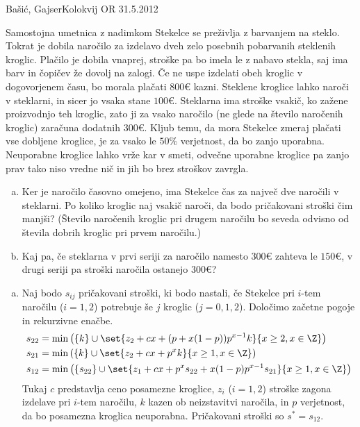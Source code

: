 \begin{naloga}{Bašić, Gajser}{Kolokvij OR 31.5.2012}
\begin{vprasanje}
Samostojna umetnica z nadimkom Stekelce se preživlja z barvanjem na steklo.
Tokrat je dobila naročilo
za izdelavo dveh zelo posebnih pobarvanih steklenih kroglic.
Plačilo je dobila vnaprej, stroške pa bo imela le z nabavo stekla,
saj ima barv in čopičev že dovolj na zalogi.
Če ne uspe izdelati obeh kroglic v dogovorjenem času,
bo morala plačati $800 €$ kazni.
Steklene kroglice lahko naroči v steklarni, in sicer jo vsaka stane $100 €$.
Steklarna ima stroške vsakič, ko zažene proizvodnjo teh kroglic,
zato ji za vsako naročilo (ne glede na število naročenih kroglic)
zaračuna dodatnih $300 €$.
Kljub temu, da mora Stekelce zmeraj plačati vse dobljene kroglice,
je za vsako le $50 \%$ verjetnost, da bo zanjo uporabna.
Neuporabne kroglice lahko vrže kar v smeti,
odvečne uporabne kroglice pa zanjo prav tako niso vredne nič
in jih bo brez stroškov zavrgla.
\begin{enumerate}[(a)]
\item Ker je naročilo časovno omejeno,
ima Stekelce čas za največ dve naročili v steklarni.
Po koliko kroglic naj vsakič naroči, da bodo pričakovani stroški čim manjši?
(Število naročenih kroglic pri drugem naročilu
bo seveda odvisno od števila dobrih kroglic pri prvem naročilu.)

\item Kaj pa,
če steklarna v prvi seriji za naročilo namesto $300 €$ zahteva le $150 €$,
v drugi seriji pa stroški naročila ostanejo $300 €$?
\end{enumerate}
\end{vprasanje}

\begin{odgovor}
\begin{enumerate}[(a)]
\item Naj bodo $s_{ij}$ pričakovani stroški, ki bodo nastali,
če Stekelce pri $i$-tem naročilu ($i = 1, 2$)
potrebuje še $j$ kroglic ($j = 0, 1, 2$).
Določimo začetne pogoje in rekurzivne enačbe.
\begin{align*}
s_{22} &= \min\left(\{k\} \cup
    \set{z_2 + cx + (p + x(1-p)) p^{x-1} k}{x \ge 2, x \in \Z}\right) \\
s_{21} &= \min\left(\{k\} \cup
    \set{z_2 + cx + p^x k}{x \ge 1, x \in \Z}\right) \\
s_{12} &= \min\left(\{s_{22}\} \cup
    \set{z_1 + cx + p^x s_{22} + x(1-p) p^{x-1} s_{21}}%
        {x \ge 1, x \in \Z}\right)
\end{align*}
Tukaj $c$ predstavlja ceno posamezne kroglice,
$z_i$ ($i = 1, 2$) stroške zagona izdelave pri $i$-tem naročilu,
$k$ kazen ob neizstavitvi naročila,
in $p$ verjetnost, da bo posamezna kroglica neuporabna.
Pričakovani stroški so $s^* = s_{12}$.


\end{enumerate}
\end{odgovor}
\end{naloga}
